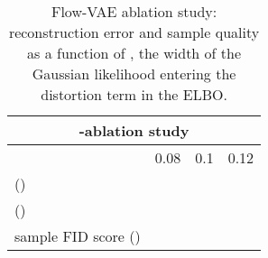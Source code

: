 \documentclass[10pt]{article} \usepackage[accepted]{tmlr}
\begin{document}
\begin{table}[h]
\begin{center}
\begin{tabular}{llll}
\multicolumn{4}{c}{-\textbf{ablation study}}                                                                                   \\ \hline
\multicolumn{1}{c|}{}   & \multicolumn{1}{c|}{0.08} & \multicolumn{1}{c|}{0.1}         & \multicolumn{1}{c}{0.12} \\ \hline
\multicolumn{1}{l|}{  ()} & \multicolumn{1}{l|}{}    & \multicolumn{1}{l|}{}    & \multicolumn{1}{l}{}  \\
\multicolumn{1}{l|}{  ()} & \multicolumn{1}{l|}{}       &  \multicolumn{1}{l|}{}  & \multicolumn{1}{l}{}\\
\multicolumn{1}{l|}{sample FID score ()} & \multicolumn{1}{l|}{}       &  \multicolumn{1}{l|}{} & \multicolumn{1}{l}{} \\
\end{tabular}
\end{center}
\caption{\label{tab:flow-ab}Flow-VAE ablation study: reconstruction error and sample quality as a function of , the width of the Gaussian likelihood entering the distortion term in the ELBO.}
\end{table}
\end{document}
